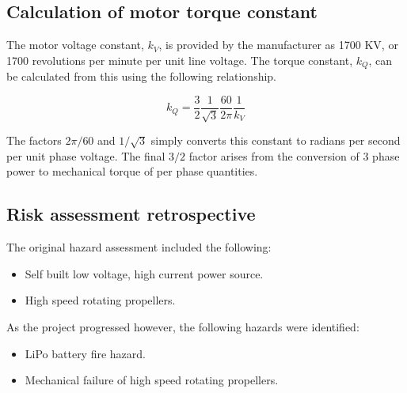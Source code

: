 \documentclass[12pt,a4paper]{article}
\begin{document}
\subsection{Calculation of motor torque constant \label{sec:appendix_motor_calibration}}

The motor voltage constant, $k_V$, is provided by the manufacturer as 1700 KV, or 1700 revolutions per minute per unit line voltage.
The torque constant, $k_Q$, can be calculated from this using the following relationship.

\begin{equation}
    k_Q = \frac{3}{2} \frac{1}{\sqrt{3}} \frac{60}{2\pi} \frac{1}{k_V}
\end{equation}

The factors $2\pi/60$ and $1/\sqrt{3}$ simply converts this constant to radians per second per unit phase voltage.
The final $3/2$ factor arises from the conversion of 3 phase power to mechanical torque of per phase quantities.

\newpage

\subsection{Risk assessment retrospective}

The original hazard assessment included the following:
\begin{itemize}
    \item Self built low voltage, high current power source.
    \item High speed rotating propellers.
\end{itemize}
As the project progressed however, the following hazards were identified:
\begin{itemize}
    \item LiPo battery fire hazard.
    \item Mechanical failure of high speed rotating propellers.
\end{itemize}

\newpage
\printbibliography
\end{document}

